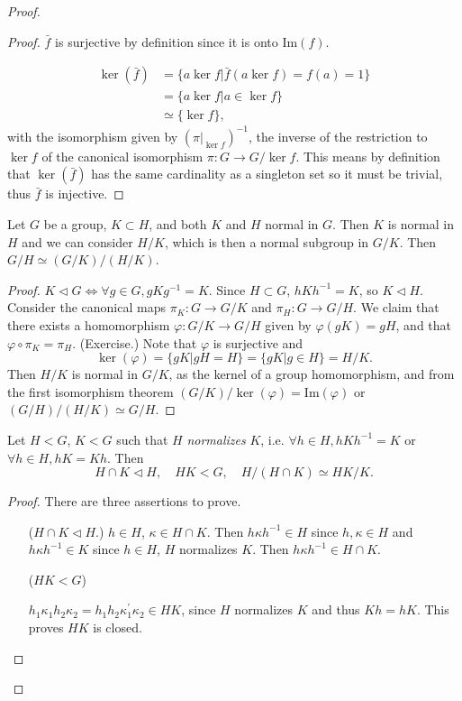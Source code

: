 \begin{proof}
\begin{proof}
$\bar{f}$ is surjective by definition since it is onto
$\mathrm{Im}(f)$.

\begin{align*}
\ker(\bar{f}) & = \{ a \ker f | \bar{f}(a \ker f) = f(a) = 1 \} \\
              & = \{ a \ker f | a \in \ker f \} \\
              & \simeq \{ \ker f \},
\end{align*}
with the isomorphism given by
$\left(\pi|_{\ker f}\right)^{-1}$,
the inverse of the restriction to $\ker f$
of the canonical isomorphism $\pi : G \to G / \ker f$.
This means by definition that $\ker(\bar{f})$ has the same cardinality
as a singleton set so it must be trivial, thus $\bar{f}$ is injective.
\end{proof}

\begin{theorem}
Let $G$ be a group, $K \subset H$, and both $K$ and $H$ normal in
$G$. Then $K$ is normal in $H$ and we can consider $H / K$, which is
then a normal subgroup in $G / K$. Then $G / H \simeq (G / K) / (H / K)$.
\end{theorem}
\begin{proof}
$K \triangleleft G \iff \forall g \in G, g K g^{-1} = K$. Since
$H \subset G$, $h K h^{-1} = K$, so $K \triangleleft H$. Consider the
canonical maps $\pi_K : G \to G / K$ and
$\pi_H : G \to G / H$. We claim that there exists a homomorphism
$\varphi : G / K \to G / H$ given by $\varphi(gK) = gH$, and that
$\varphi \circ \pi_K = \pi_H$. (Exercise.) Note that $\varphi$ is
surjective and
$$
\ker(\varphi)
  = \{ gK | gH = H \}
  = \{ gK | g \in H \}
  = H / K.
$$
Then $H / K$ is normal in $G / K$, as the kernel of a group
homomorphism, and from the first isomorphism theorem
$(G / K) / \ker(\varphi) = \mathrm{Im}(\varphi)$
or $(G / H) / (H / K) \simeq G / H$.
\end{proof}

\begin{theorem}
Let $H < G$, $K < G$ such that $H$ \emph{normalizes} $K$, i.e.
$\forall h \in H, h K h^{-1} = K$ or
$\forall h \in H, h K = K h$. Then
$$
H \cap K \triangleleft H,
\quad HK < G,
\quad H / (H \cap K) \simeq HK / K.
$$
\end{theorem}
\begin{proof} There are three assertions to prove.
\begin{itemize}
  \item[($H \cap K \triangleleft H$.)]{
        $h \in H$, $\kappa \in H \cap K$. Then
        $h \kappa h^{-1} \in H$ since $h, \kappa \in H$
        and $h \kappa h^{-1} \in K$ since $h \in H$, $H$ normalizes
        $K$.
        Then $h \kappa h^{-1} \in H \cap K$.
       }
  \item[($HK < G$)]{
        $h_1 \kappa_1 h_2 \kappa_2
       = h_1 h_2 \kappa_1^\prime \kappa_2
       \in HK$, since $H$ normalizes $K$ and thus $Kh = hK$.
       This proves $HK$ is closed.

}
\end{itemize}
\end{proof}
\end{proof}
